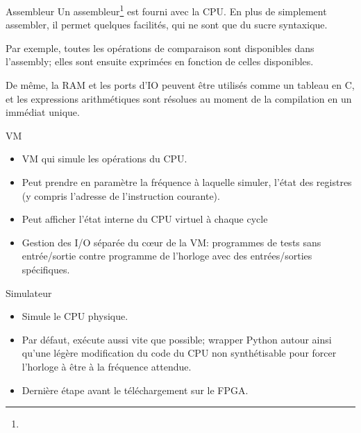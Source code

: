 \documentclass{beamer}
\begin{document}
\begin{frame}{Assembleur}
  Un assembleur\footnote{} est fourni avec la CPU. En plus
  de simplement assembler, il permet quelques facilités, qui ne sont
  que du sucre syntaxique.\par
  \pause
  Par exemple, toutes les opérations de comparaison sont disponibles
  dans l'assembly; elles sont ensuite exprimées en fonction de celles
  disponibles.\par
  \pause
  De même, la RAM et les ports d'IO peuvent être utilisés comme un
  tableau en C, et les expressions arithmétiques sont résolues au
  moment de la compilation en un immédiat unique.
\end{frame}

\begin{frame}{VM}
  \begin{itemize}
  \item VM qui simule les opérations du CPU.
    \pause
  \item Peut prendre en paramètre la fréquence à laquelle simuler,
    l'état des registres (y compris l'adresse de l'instruction
    courante).
    \pause
  \item Peut afficher l'état interne du CPU virtuel à chaque cycle
    \pause
  \item Gestion des I/O séparée du c\oe{}ur de la VM: programmes de
    tests sans entrée/sortie contre programme de l'horloge avec des
    entrées/sorties spécifiques.
  \end{itemize}
\end{frame}

\begin{frame}{Simulateur}
  \begin{itemize}
  \item Simule le CPU physique.
    \pause
  \item Par défaut, exécute aussi vite que possible; wrapper Python
    autour ainsi qu'une légère modification du code du CPU non
    synthétisable pour forcer l'horloge à être à la fréquence attendue.
    \pause
  \item Dernière étape avant le téléchargement sur le FPGA.
  \end{itemize}
\end{frame}
\end{document}
